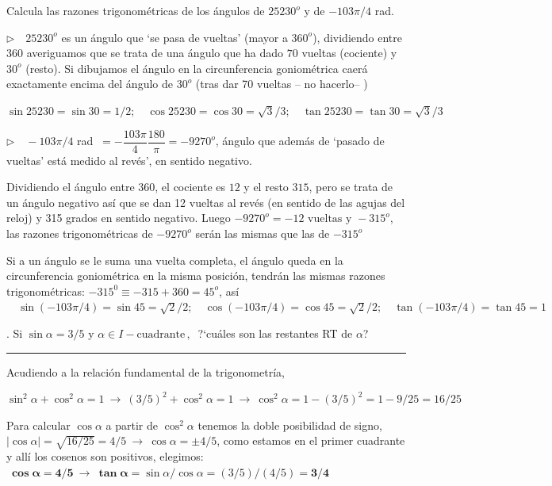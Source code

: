 \begin{miejemplo}

Calcula las razones trigonométricas de los ángulos de $25230^o$ y de $-103\pi/4$ rad.

\vspace{5mm} $\triangleright \quad 25230^o$ es un ángulo que `se pasa de vueltas' (mayor a $360^o$), dividiendo entre 360 averiguamos que se trata de una ángulo que ha dado $70$ vueltas (cociente) y $30^o$	 (resto). Si dibujamos el ángulo en la circunferencia goniométrica caerá exactamente encima del ángulo de $30^o$ (tras dar 70 vueltas -- no hacerlo-- \smiley{} )

\vspace{2mm} $\sin 25230=\sin 30=1/2;\quad \cos 25230=\cos 30=\sqrt{3}/3;\quad \tan 25230=\tan 30=\sqrt{3}/3$

\vspace{5mm} $\triangleright \quad -103\pi/4$ rad $\ = -\dfrac{103 \pi}{4} \dfrac{180}{\pi}=-9270^o$, ángulo que además de `pasado de vueltas' está medido al revés', en sentido negativo.

\vspace{2mm} Dividiendo el ángulo entre $360$, el cociente es $12$ y el resto $315$, pero se trata de un ángulo negativo así que se dan 12 vueltas al revés (en sentido de las agujas del reloj) y 315 grados en sentido negativo.  Luego $-9270^o = -12 \text{ vueltas y } -315^o$, las razones trigonométricas de $-9270^o$ serán las mismas que las de $-315^o$

\vspace{2mm} Si a un ángulo se le suma una vuelta completa, el ángulo queda en la circunferencia goniométrica en la misma posición, tendrán las mismas razones trigonométricas: $-315^0 \equiv -315+360=45^o$, así $\quad \sin(-103\pi/4)=\sin 45=\sqrt{2}/2;\quad \cos(-103\pi/4)=\cos 45=\sqrt{2}/2;\quad \tan(-103\pi/4)=\tan 45=1$


\end{miejemplo}


\begin{miejercicio}
. Si 	$\sin \alpha=3/5$ y $\alpha \in I-\text{cuadrante}\, , \ $ ?`cuáles son las restantes RT de $\alpha$?

\rule{250pt}{0.1pt}	

\vspace{5mm} Acudiendo a la relación fundamental de la trigonometría,

\vspace{2mm}  $\sin^2 \alpha + \cos^2 \alpha = 1 \ \to \ (3/5)^2 + \cos^2 \alpha = 1 \ \to \ \cos^2 \alpha = 1-(3/5)^2=1-9/25=16/25$

\vspace{2mm} Para calcular $\cos \alpha$ a partir de $\cos^2 \alpha$ tenemos la doble posibilidad de signo, $|\cos \alpha|=\sqrt{16/25}=4/5 \ \to \ \cos \alpha=\pm 4/5$, como estamos en el primer cuadrante y allí los cosenos son positivos, elegimos:
$\ \boldsymbol{\cos \alpha =4/5} \ \to \ \boldsymbol{\tan \alpha}=\sin \alpha / \cos \alpha = (3/5)/(4/5)=\boldsymbol{3/4}$
\end{miejercicio}


